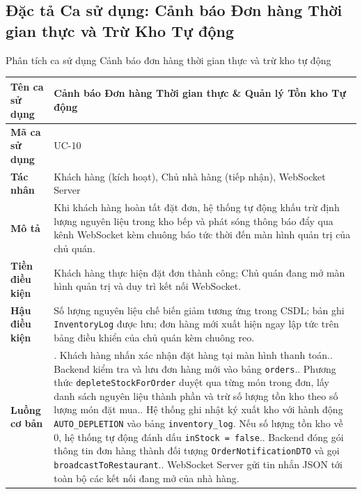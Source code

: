 \documentclass{uetgraduation}
\begin{document}
\clearpage
\subsection{Đặc tả Ca sử dụng: Cảnh báo Đơn hàng Thời gian thực và Trừ Kho Tự động}
\begin{table}[!htbp]{Phân tích ca sử dụng Cảnh báo đơn hàng thời gian thực và trừ kho tự động}
\centering
\small
\begin{tabularx}{\textwidth}{|l|>{\raggedright\arraybackslash}X|}
\hline
\textbf{Tên ca sử dụng} & \textbf{Cảnh báo Đơn hàng Thời gian thực \& Quản lý Tồn kho Tự động} \\ \hline
\textbf{Mã ca sử dụng} & UC-10 \\ \hline
\textbf{Tác nhân} & Khách hàng (kích hoạt), Chủ nhà hàng (tiếp nhận), WebSocket Server \\ \hline
\textbf{Mô tả} & Khi khách hàng hoàn tất đặt đơn, hệ thống tự động khấu trừ định lượng nguyên liệu trong kho bếp và phát sóng thông báo đẩy qua kênh WebSocket kèm chuông báo tức thời đến màn hình quản trị của chủ quán. \\ \hline
\textbf{Tiền điều kiện} & Khách hàng thực hiện đặt đơn thành công; Chủ quán đang mở màn hình quản trị và duy trì kết nối WebSocket. \\ \hline
\textbf{Hậu điều kiện} & Số lượng nguyên liệu chế biến giảm tương ứng trong CSDL; bản ghi \texttt{InventoryLog} được lưu; đơn hàng mới xuất hiện ngay lập tức trên bảng điều khiển của chủ quán kèm chuông reo. \\ \hline
\textbf{Luồng cơ bản} & 
1. Khách hàng nhấn xác nhận đặt hàng tại màn hình thanh toán.\newline
2. Backend kiểm tra và lưu đơn hàng mới vào bảng \texttt{orders}.\newline
3. Phương thức \texttt{depleteStockForOrder} duyệt qua từng món trong đơn, lấy danh sách nguyên liệu thành phần và trừ số lượng tồn kho theo số lượng món đặt mua.\newline
4. Hệ thống ghi nhật ký xuất kho với hành động \texttt{AUTO\_DEPLETION} vào bảng \texttt{inventory\_log}. Nếu số lượng tồn kho về 0, hệ thống tự động đánh dấu \texttt{inStock = false}.\newline
5. Backend đóng gói thông tin đơn hàng thành đối tượng \texttt{OrderNotificationDTO} và gọi \texttt{broadcastToRestaurant}.\newline
6. WebSocket Server gửi tin nhắn JSON tới toàn bộ các kết nối đang mở của nhà hàng.\newline

\end{tabularx}
\end{table}
\end{document}
